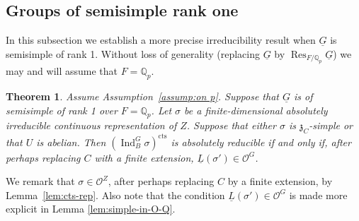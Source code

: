 \documentclass[a4paper]{amsart}
\numberwithin{equation}{section}
\newtheorem{thm}{Theorem}[section]
\theoremstyle{remark}
\theoremstyle{definition}
\DeclareMathOperator{\Ind}{Ind}
\DeclareMathOperator{\Res}{Res}
\newcommand{\Q}{\mathbb{Q}}
\newcommand{\alggrp}[1]{\underline{#1}}
\newcommand{\cts}{\mathrm{cts}}
\begin{document}
\subsection{Groups of semisimple rank one}
\label{sec:rank-1-case}

In this subsection we establish a more precise irreducibility result when $\alggrp G$ is semisimple of rank 1.
Without loss of generality (replacing $\alggrp G$ by $\Res_{F/\Q_p} \alggrp G$) we may and will assume that $F = \Q_p$.

\begin{thm}\label{thm:rank-1}
  Assume Assumption~\ref{assump:on p}.
  Suppose that $\alggrp G$ is of semisimple of rank 1 over $F = \Q_p$.
  Let $\sigma$ be a finite-dimensional absolutely irreducible continuous representation of $Z$.
  Suppose that either $\sigma$ is $\mathfrak z_C$-simple or that $U$ is abelian.
  Then $(\Ind_{B}^{G}\sigma)^{\cts}$ is absolutely reducible if and only if, after perhaps replacing $C$ with a finite extension, 
  $\underline L(\sigma') \in \mathcal O^G$.
\end{thm}

We remark that $\sigma \in \mathcal O^Z$, after perhaps replacing $C$ by a finite extension, by Lemma~\ref{lem:cts-rep}.
Also note that the condition $\underline L(\sigma') \in \mathcal O^G$ is made more explicit in Lemma \ref{lem:simple-in-O-Q}.
\end{document}
